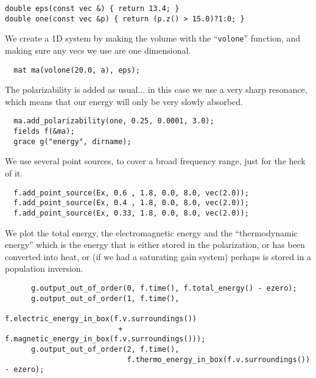 \begin{verbatim}
double eps(const vec &) { return 13.4; }
double one(const vec &p) { return (p.z() > 15.0)?1:0; }
\end{verbatim}
\begin{comment}
int main(int argc, char **argv) {
  initialize mpi(argc, argv);
  deal_with_ctrl_c();
  const double ttot = 600.0;
\end{comment}
We create a 1D system by making the volume with the ``\verb!volone!''
function, and making sure any vecs we use are one dimensional.
\begin{verbatim}
  mat ma(volone(20.0, a), eps);
\end{verbatim}
\begin{comment}
  const char *dirname = make_output_directory(__FILE__);
  ma.set_output_directory(dirname);
\end{comment}
The polarizability is added as usual... in this case we use a very sharp
resonance, which means that our energy will only be very slowly absorbed.
\begin{verbatim}
  ma.add_polarizability(one, 0.25, 0.0001, 3.0);
  fields f(&ma);
  grace g("energy", dirname);
\end{verbatim}
We use several point sources, to cover a broad frequency range, just for
the heck of it.
\begin{verbatim}
  f.add_point_source(Ex, 0.6 , 1.8, 0.0, 8.0, vec(2.0));
  f.add_point_source(Ex, 0.4 , 1.8, 0.0, 8.0, vec(2.0));
  f.add_point_source(Ex, 0.33, 1.8, 0.0, 8.0, vec(2.0));
\end{verbatim}
\begin{comment}
  const double ezero = f.total_energy();
  double next_printtime = 10;
  while (f.time() < ttot && !interrupt) {
    if (f.time() >= next_printtime) {
      next_printtime += 10;
      master_printf("Working on time %
      master_printf("energy is %
      master_printf("thermo energy is %
      //f.eps_slices();
\end{comment}
We plot the total energy, the electromagnetic energy and the
``thermodynamic energy'' which is the energy that is either stored in the
polarization, or has been converted into heat, or (if we had a saturating
gain system) perhaps is stored in a population inversion.
\begin{verbatim}
      g.output_out_of_order(0, f.time(), f.total_energy() - ezero);
      g.output_out_of_order(1, f.time(),
                            f.electric_energy_in_box(f.v.surroundings())
                          + f.magnetic_energy_in_box(f.v.surroundings()));
      g.output_out_of_order(2, f.time(),
                            f.thermo_energy_in_box(f.v.surroundings()) - ezero);
\end{verbatim}
\begin{comment}
    }
    f.step();
  }
}
\end{comment}

